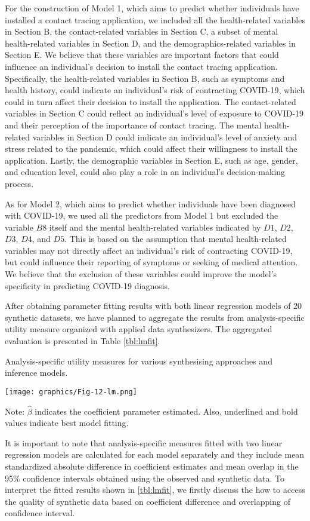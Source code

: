 For the construction of Model 1, which aims to predict whether individuals have installed a contact tracing application, we included all the health-related variables in Section B, the contact-related variables in Section C, a subset of mental health-related variables in Section D, and the demographics-related variables in Section E. We believe that these variables are important factors that could influence an individual's decision to install the contact tracing application. Specifically, the health-related variables in Section B, such as symptoms and health history, could indicate an individual's risk of contracting COVID-19, which could in turn affect their decision to install the application. The contact-related variables in Section C could reflect an individual's level of exposure to COVID-19 and their perception of the importance of contact tracing. The mental health-related variables in Section D could indicate an individual's level of anxiety and stress related to the pandemic, which could affect their willingness to install the application. Lastly, the demographic variables in Section E, such as age, gender, and education level, could also play a role in an individual's decision-making process.

As for Model 2, which aims to predict whether individuals have been diagnosed with COVID-19, we used all the predictors from Model 1 but excluded the variable $B8$ itself and the mental health-related variables indicated by $D1$, $D2$, $D3$, $D4$, and $D5$. This is based on the assumption that mental health-related variables may not directly affect an individual's risk of contracting COVID-19, but could influence their reporting of symptoms or seeking of medical attention. We believe that the exclusion of these variables could improve the model's specificity in predicting COVID-19 diagnosis.

 After obtaining parameter fitting results with both linear regression models of 20 synthetic datasets, we have planned to aggregate the results from analysis-specific utility measure organized with applied data synthesizers. The aggregated evaluation is presented in Table \ref{tbl:lmfit}. 
 \begin{table}[H]
  \centering
  \caption{Analysis-specific utility measures for various synthesising approaches and inference models.}
  \label{tbl:lmfit}
  \texttt{[image: graphics/Fig-12-lm.png]}
    {\raggedright {\scriptsize Note: $\hat{\beta}$ indicates the coefficient parameter estimated. Also, underlined and bold values indicate best model fitting.} \par}
\end{table}
It is important to note that analysis-specific measures fitted with two linear regression models are calculated for each model separately and they include mean standardized absolute difference in coefficient estimates and mean overlap in the 95\% confidence intervals obtained using the observed and synthetic data. To interpret the fitted results shown in \ref{tbl:lmfit}, we firstly discuss the how to access the quality of synthetic data based on coefficient difference and overlapping of confidence interval. 


